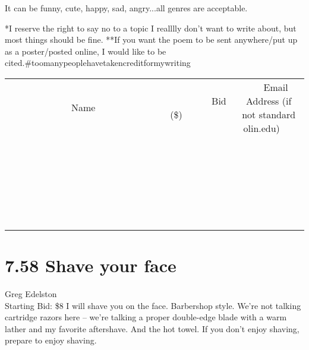 \documentclass[11pt]{article}
\begin{document}
It can be funny, cute, happy, sad, angry...all genres are acceptable.

*I reserve the right to say no to a topic I realllly don't want to write about, but most things should be fine.
**If you want the poem to be sent anywhere/put up as a poster/posted online, I would like to be cited.\#toomanypeoplehavetakencreditformywriting
\\[6ex]
\begin{tabular}{c c c}
~~~~~~~~~~~~~Name~~~~~~~~~~~~~ & ~~~~~~~~~Bid (\$)~~~~~~~~~  & ~~~Email Address (if not standard olin.edu)~~~\\
 & & \\
\hline
 & & \\
\hline
 & & \\
\hline
 & & \\
\hline
 & & \\
\hline
 & & \\
\hline
 & & \\
\hline
 & & \\
\hline
 & & \\
\hline
 & & \\
\hline
 & & \\
\hline
 & & \\
\hline
 & & \\
\hline
 & & \\
\hline
 & & \\
\hline
 & & \\
\hline
 & & \\
\hline
 & & \\
\hline
 & & \\
\hline
 & & \\
\hline
 & & \\
\hline
 & & \\
\hline
 & & \\
\hline
 & & \\
\hline
 & & \\
\hline
 & & \\
\hline
\end{tabular}
\newpage
\section*{7.58 Shave your face}
Greg Edelston
\\
Starting Bid: \$8
\newline
I will shave you on the face. Barbershop style. We're not talking cartridge razors here -- we're talking a proper double-edge blade with a warm lather and my favorite aftershave. And the hot towel. If you don't enjoy shaving, prepare to enjoy shaving.
\end{document}
